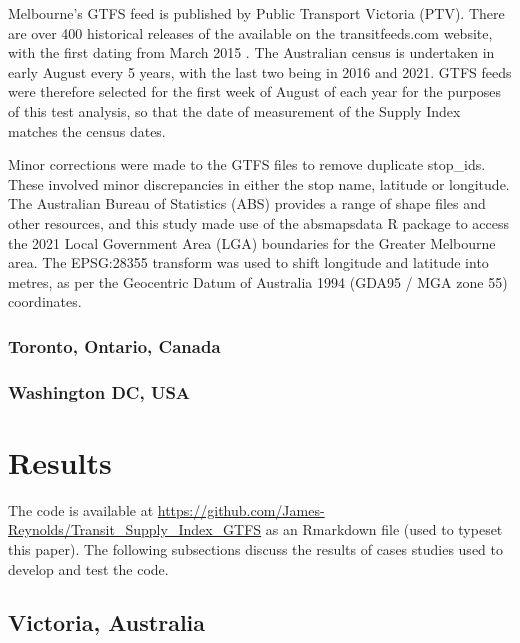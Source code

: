 \documentclass[]{tufte-book}
\begin{document}
Melbourne's GTFS feed is published by Public Transport Victoria (PTV).
There are over 400 historical releases of the available on the
transitfeeds.com website, with the first dating from March 2015
\citep{transitfeeds_victoria:2023aa}. The Australian census is
undertaken in early August every 5 years, with the last two being in
2016 and 2021. GTFS feeds were therefore selected for the first week of
August of each year for the purposes of this test analysis, so that the
date of measurement of the Supply Index matches the census dates.

Minor corrections were made to the GTFS files to remove duplicate
stop\_ids. These involved minor discrepancies in either the stop name,
latitude or longitude. The Australian Bureau of Statistics (ABS)
provides a range of shape files and other resources, and this study made
use of the absmapsdata R package \citep{R-absmapsdata} to access the
2021 Local Government Area (LGA) boundaries for the Greater Melbourne
area. The EPSG:28355 transform \citep{EPSG_28355} was used to shift
longitude and latitude into metres, as per the Geocentric Datum of
Australia 1994 (GDA95 / MGA zone 55) coordinates.

\hypertarget{toronto-ontario-canada}{%
\subsection{Toronto, Ontario, Canada}\label{toronto-ontario-canada}}

\hypertarget{washington-dc-usa}{%
\subsection{Washington DC, USA}\label{washington-dc-usa}}

\hypertarget{results}{%
\chapter{Results}\label{results}}

The code is available at
\url{https://github.com/James-Reynolds/Transit_Supply_Index_GTFS} as an
Rmarkdown file (used to typeset this paper). The following subsections
discuss the results of cases studies used to develop and test the code.

\hypertarget{victoria-australia}{%
\section{Victoria, Australia}\label{victoria-australia}}
\end{document}
